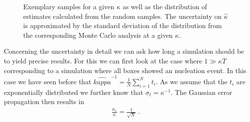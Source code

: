 \begin{figure}[ht]
\begin{center}
 \hspace{0.5cm}
\caption[Monte Carlo uncertainty estimation example]{Exemplary samples for a given $\kappa$ as well as the distribution of estimates calculated from the random samples. The uncertainty on $\hat{\kappa}$ is approximated by the standard deviation of the distribution from the corresponding Monte Carlo analysis at a given $\kappa$.}
\label{fig:mc_example}
\end{center}
\end{figure}
Concerning the uncertainty in detail we can ask how long a simulation should be to yield precise results. For this we can first look at the case where $1 \gg \kappa T$ corresponding to a simulation where all boxes showed an nucleation event. In this case we have seen before that $\hat{kappa}^{-1} = \frac{1}{N} \sum_{i=1}^N t_i$. As we assume that the $t_i$ are exponentially distributed we further know that $\sigma_{t} = \kappa^{-1}$. The Gaussian error propagation then results in
\begin{align}
\label{eqn:uncertainty_k_gg}
\frac{\sigma_{\kappa}}{\kappa} = \frac{1}{\sqrt{N}} \; \text{.}
\end{align}


